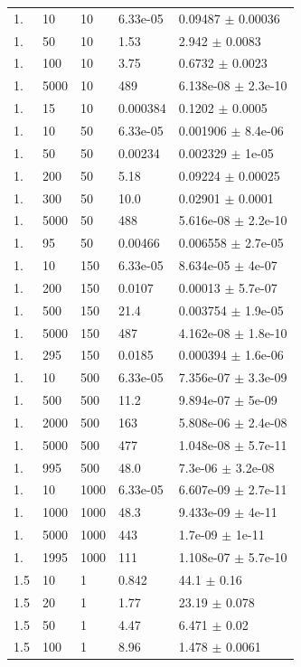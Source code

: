 \begin{longtable}{lllll}
	1. & 10 & 10 & 6.33e-05 & 0.09487 $\pm$ 0.00036 \\
	1. & 50 & 10 & 1.53 & 2.942 $\pm$ 0.0083 \\
	1. & 100 & 10 & 3.75 & 0.6732 $\pm$ 0.0023 \\
	1. & 5000 & 10 & 489 & 6.138e-08 $\pm$ 2.3e-10 \\
	1. & 15 & 10 & 0.000384 & 0.1202 $\pm$ 0.0005 \\
	1. & 10 & 50 & 6.33e-05 & 0.001906 $\pm$ 8.4e-06 \\
	1. & 50 & 50 & 0.00234 & 0.002329 $\pm$ 1e-05 \\
	1. & 200 & 50 & 5.18 & 0.09224 $\pm$ 0.00025 \\
	1. & 300 & 50 & 10.0 & 0.02901 $\pm$ 0.0001 \\
	1. & 5000 & 50 & 488 & 5.616e-08 $\pm$ 2.2e-10 \\
	1. & 95 & 50 & 0.00466 & 0.006558 $\pm$ 2.7e-05 \\
	1. & 10 & 150 & 6.33e-05 & 8.634e-05 $\pm$ 4e-07 \\
	1. & 200 & 150 & 0.0107 & 0.00013 $\pm$ 5.7e-07 \\
	1. & 500 & 150 & 21.4 & 0.003754 $\pm$ 1.9e-05 \\
	1. & 5000 & 150 & 487 & 4.162e-08 $\pm$ 1.8e-10 \\
	1. & 295 & 150 & 0.0185 & 0.000394 $\pm$ 1.6e-06 \\
	1. & 10 & 500 & 6.33e-05 & 7.356e-07 $\pm$ 3.3e-09 \\
	1. & 500 & 500 & 11.2 & 9.894e-07 $\pm$ 5e-09 \\
	1. & 2000 & 500 & 163 & 5.808e-06 $\pm$ 2.4e-08 \\
	1. & 5000 & 500 & 477 & 1.048e-08 $\pm$ 5.7e-11 \\
	1. & 995 & 500 & 48.0 & 7.3e-06 $\pm$ 3.2e-08 \\
	1. & 10 & 1000 & 6.33e-05 & 6.607e-09 $\pm$ 2.7e-11 \\
	1. & 1000 & 1000 & 48.3 & 9.433e-09 $\pm$ 4e-11 \\
	1. & 5000 & 1000 & 443 & 1.7e-09 $\pm$ 1e-11 \\
	1. & 1995 & 1000 & 111 & 1.108e-07 $\pm$ 5.7e-10 \\
	1.5 & 10 & 1 & 0.842 & 44.1 $\pm$ 0.16 \\
	1.5 & 20 & 1 & 1.77 & 23.19 $\pm$ 0.078 \\
	1.5 & 50 & 1 & 4.47 & 6.471 $\pm$ 0.02 \\
	1.5 & 100 & 1 & 8.96 & 1.478 $\pm$ 0.0061 \\

\end{longtable}
